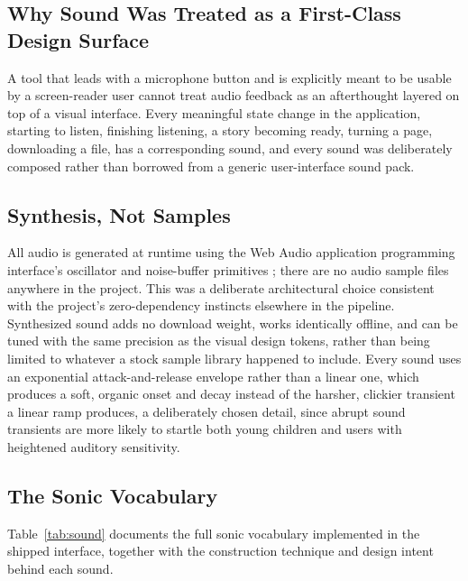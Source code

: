 \documentclass[conference]{IEEEtran}
\begin{document}
\subsection{Why Sound Was Treated as a First-Class Design Surface}

A tool that leads with a microphone button and is explicitly meant to be usable by a screen-reader user cannot treat audio feedback as an afterthought layered on top of a visual interface. Every meaningful state change in the application, starting to listen, finishing listening, a story becoming ready, turning a page, downloading a file, has a corresponding sound, and every sound was deliberately composed rather than borrowed from a generic user-interface sound pack.

\subsection{Synthesis, Not Samples}

All audio is generated at runtime using the Web Audio application programming interface's oscillator and noise-buffer primitives \cite{w3cwebaudio}; there are no audio sample files anywhere in the project. This was a deliberate architectural choice consistent with the project's zero-dependency instincts elsewhere in the pipeline. Synthesized sound adds no download weight, works identically offline, and can be tuned with the same precision as the visual design tokens, rather than being limited to whatever a stock sample library happened to include. Every sound uses an exponential attack-and-release envelope rather than a linear one, which produces a soft, organic onset and decay instead of the harsher, clickier transient a linear ramp produces, a deliberately chosen detail, since abrupt sound transients are more likely to startle both young children and users with heightened auditory sensitivity.

\subsection{The Sonic Vocabulary}

Table~\ref{tab:sound} documents the full sonic vocabulary implemented in the shipped interface, together with the construction technique and design intent behind each sound.
\end{document}

